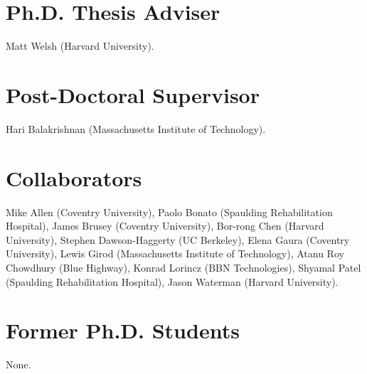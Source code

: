 \section{Ph.D. Thesis Adviser}

Matt Welsh (Harvard University).

\section{Post-Doctoral Supervisor}

Hari Balakrishnan (Massachusetts Institute of Technology).

\section{Collaborators}

Mike Allen (Coventry University), Paolo Bonato (Spaulding Rehabilitation
Hospital), James Brusey (Coventry University), Bor-rong Chen (Harvard
University), Stephen Dawson-Haggerty (UC Berkeley), Elena Gaura (Coventry
University), Lewis Girod (Massachusetts Institute of Technology), Atanu Roy
Chowdhury (Blue Highway), Konrad Lorincz (BBN Technologies), Shyamal Patel
(Spaulding Rehabilitation Hospital), Jason Waterman (Harvard University).

\section{Former Ph.D. Students}

None.


